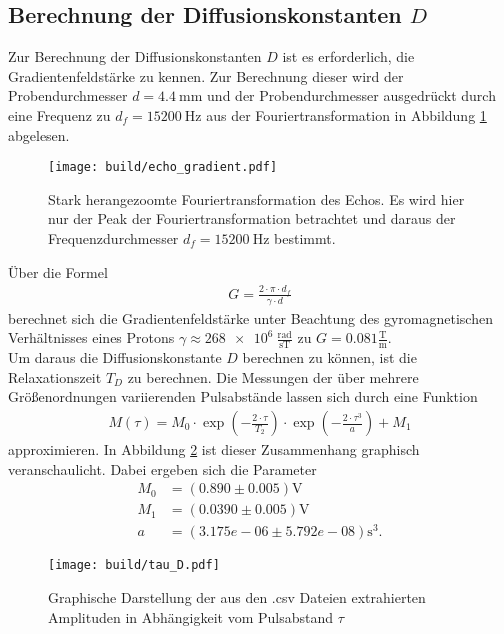\subsection{Berechnung der Diffusionskonstanten $D$}
\noindent Zur Berechnung der Diffusionskonstanten $D$ ist es erforderlich, die
Gradientenfeldstärke zu kennen. Zur Berechnung dieser wird der Probendurchmesser
$d = \SI{4.4}{\milli\meter}$ und der Probendurchmesser ausgedrückt durch eine
Frequenz zu $d_f = \SI{15200}{\hertz}$ aus der Fouriertransformation in Abbildung \ref{fig:d_f} abgelesen. 
\begin{figure}
  \texttt{[image: build/echo\_gradient.pdf]}
  \caption{Stark herangezoomte Fouriertransformation des Echos. Es wird hier nur der Peak der Fouriertransformation betrachtet und daraus der Frequenzdurchmesser $d_f = \SI{15200}{\hertz}$ bestimmt.}
  \label{fig:d_f}
\end{figure}
Über die Formel
\begin{align}
  G = \frac{2 \cdot \pi \cdot d_f}{\gamma \cdot d}
  \label{eqn:05}
\end{align}
\noindent berechnet sich die Gradientenfeldstärke unter Beachtung des
gyromagnetischen Verhältnisses eines Protons $\gamma \approx \num{268e6} \:
\frac{\text{rad}}{\si{\second\tesla}}$ zu
$G = \num{0.081} \frac{\si{\tesla}}{\si{\meter}}$. \\
\noindent Um daraus die Diffusionskonstante $D$ berechnen zu können, ist die
Relaxationszeit $T_D$ zu berechnen. Die Messungen der über mehrere
Größenordnungen variierenden Pulsabstände lassen sich durch eine Funktion
\begin{align}
  M(\tau) = M_0 \cdot \exp{\left(- \frac{2 \cdot \tau}{T_2}\right)} \cdot \exp{\left(- \frac{2 \cdot \tau^3}{a}\right)} + M_1
 \label{eqn:06}
\end{align}
\noindent approximieren. In Abbildung \ref{fig:03} ist dieser Zusammenhang
graphisch veranschaulicht. Dabei ergeben sich die Parameter
\begin{align*}
  M_0 &=  (0.890  \pm  0.005)          \si{\volt} \\
  M_1 &=  (0.0390  \pm  0.005)         \si{\volt} \\
  a &=  (3.175e-06  \pm  5.792e-08) \si{\second^3}.
\end{align*}
\FloatBarrier
\begin{figure}
  \texttt{[image: build/tau\_D.pdf]}
  \caption{Graphische Darstellung der aus den .csv Dateien extrahierten
  Amplituden in Abhängigkeit vom Pulsabstand $\tau$}
  \label{fig:03}
\end{figure}
